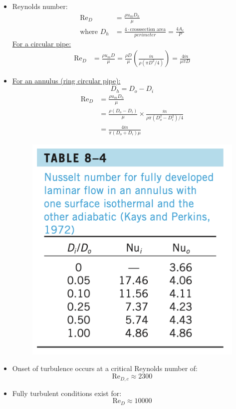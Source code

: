 \begin{itemize}
        \item Reynolds number:
        \begin{align*}
            \text{Re}_D &= \frac{\rho u_m D_h}{\mu} \\
            \text{where } D_h &= \frac{4\cdot\text{crosssection area}}{perimeter} = \frac{4A_c}{P}
        \end{align*}
        \color{red}\underline{For a circular pipe:}\color{black}
        \begin{align*}
            \text{Re}_D &= \frac{\rho u_m D}{\mu} = \frac{\rho D}{\mu} \left(\frac{\dot{m}}{\rho (\pi D^2 /4)}\right) = \frac{4\dot{m}}{\mu \pi D}
        \end{align*}
        \item \color{red}\underline{For an annulus (ring circular pipe):}\color{black}
        \begin{equation*}
            D_h = D_o - D_i
        \end{equation*}
        \begin{align*}
            \text{Re}_D &= \frac{\rho u_m D_h}{\mu} \\
            &= \frac{\rho (D_o - D_i)}{\mu} \times \frac{\dot{m}}{\rho \pi (D_o^2 - D_i^2)/4} \\
            &= \frac{4 \dot{m}}{\pi (D_o + D_i)\mu }
        \end{align*}
        \begin{figure}[H]
            \centering
            \includegraphics[width=0.7\linewidth]{images/internal_flow_annulus.png}
        \end{figure}
        \item Onset of turbulence occurs at a critical Reynolds number of:
        \begin{equation*}
            \text{Re}_{D,c} \approx 2300
        \end{equation*}
        \item Fully turbulent conditions exist for: 
        \begin{equation*}
            \text{Re}_D\approx 10000
        \end{equation*}
\end{itemize}
